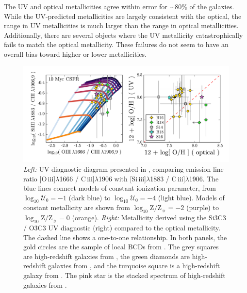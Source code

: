\documentclass[preprint2]{aastex62}
\newcommand{\oiii}{[O\,{\sc iii}]\xspace}
\newcommand{\SiuIII}{[Si\,{\sc iii}]\xspace}
\newcommand{\ciii}{C\,{\sc iii}]\xspace}
\newcommand{\logten}{\ensuremath{\log_{10}}}
\newcommand{\logZeq}[1]{\ensuremath{\logten \mathrm{Z}/\mathrm{Z}_{\sun} = #1}}
\newcommand{\logUeq}[1]{\ensuremath{\logten \mathcal{U}_0 = #1}}
\begin{document}
The UV and optical metallicities agree within error for ${\sim}80\%$ of the \citet{Berg+2016} galaxies. While the UV-predicted metallicities are largely consistent with the optical, the range in UV metallicities is much larger than the range in optical metallicities. Additionally, there are several objects where the UV metallicity catastrophically fails to match the optical metallicity. These failures do not seem to have an overall bias toward higher or lower metallicities.

\begin{figure}
  \begin{center}
    \includegraphics[width=\linewidth]{figs/f3.png}
    \caption{\emph{Left:} UV diagnostic diagram presented in \citet{Byler+2018}, comparing emission line ratio \oiii$\lambda$1666 / \ciii$\lambda$1906 with \SiuIII$\lambda$1883 / \ciii$\lambda$1906. The blue lines connect models of constant ionization parameter, from \logUeq{-1} (dark blue) to \logUeq{-4} (light blue). Models of constant metallicity are shown from \logZeq{-2} (purple) to \logZeq{0} (orange). \emph{Right:} Metallicity derived using the Si3C3 / O3C3 UV diagnostic (right) compared to the optical metallicity. The dashed line shows a one-to-one relationship. In both panels, the gold circles are the sample of local BCDs from \citet{Berg+2016}. The grey squares are high-redshift galaxies from \citet{Stark+2014}, the green diamonds are high-redshift galaxies from \citet{Rigby+2018b}, and the turquoise square is a high-redshift galaxy from \citet{Berg+2018}. The pink star is the stacked spectrum of high-redshift galaxies from \citet{Steidel+2016}.}
    \label{fig:UVC}
  \end{center}
\end{figure}
\end{document}

